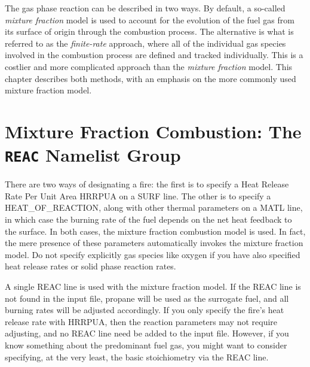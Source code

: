 \documentclass[11pt]{book}
\begin{document}
The gas phase reaction can be described in two ways. By default, a so-called {\em mixture fraction} model is used to account for the evolution of
the fuel gas from its surface of origin through the combustion process. The alternative is what is referred to as the {\em finite-rate}
approach, where all of the individual gas species involved in the combustion process are defined and tracked individually. This is a
costlier and more complicated approach than the {\em mixture fraction} model. This chapter describes both methods, with an emphasis on the more
commonly used mixture fraction model.


\section{Mixture Fraction Combustion: The \texorpdfstring{{\tt REAC}}{REAC} Namelist Group}
\label{info:REAC}


There are two ways of designating a fire: the first is to specify a
Heat Release Rate Per Unit Area {\ct HRRPUA} on a
{\ct SURF} line. The other is to specify a
{\ct HEAT\_OF\_REACTION}, along with other thermal parameters on a {\ct MATL} line,
in which case the burning rate of the fuel depends on the net heat feedback to the surface.
In both cases, the mixture fraction combustion model is used. In fact, the mere presence of these
parameters automatically invokes the mixture fraction model. Do not specify explicitly gas species like
oxygen if you have also specified heat release rates or solid phase reaction rates.

A single {\ct REAC} line is used with the mixture fraction model. If the {\ct REAC} line is not found in the input file, propane will
be used as the surrogate fuel, and all burning rates will be adjusted accordingly.
If you only specify the fire's heat release
rate with {\ct HRRPUA}, then the reaction parameters may not
require adjusting, and no {\ct REAC} line need be added to the input file.
However, if you know something about the predominant fuel gas, you might want to consider
specifying, at the very least, the basic stoichiometry via the {\ct REAC} line.
\end{document}
